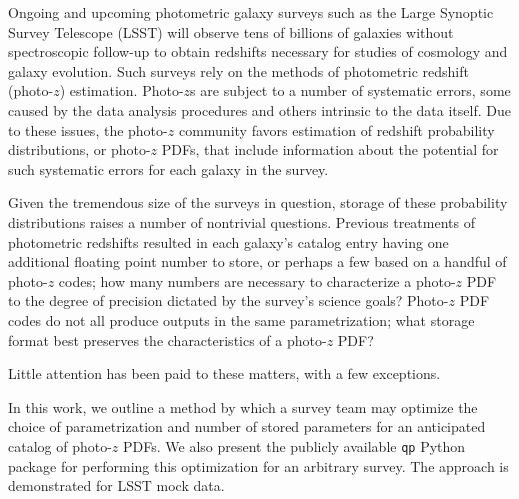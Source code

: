 \documentclass[\docopts]{\docclass}
\begin{document}
Ongoing and upcoming photometric galaxy surveys such as the Large Synoptic Survey Telescope (LSST) will observe tens of billions of galaxies without spectroscopic follow-up to obtain redshifts necessary for studies of cosmology and galaxy evolution.  Such surveys rely on the methods of photometric redshift (photo-$z$) estimation.  Photo-$z$s are subject to a number of systematic errors, some caused by the data analysis procedures and others intrinsic to the data itself.  Due to these issues, the photo-$z$ community favors estimation of redshift probability distributions, or photo-$z$ PDFs, that include information about the potential for such systematic errors for each galaxy in the survey.

Given the tremendous size of the surveys in question, storage of these probability distributions raises a number of nontrivial questions.  Previous treatments of photometric redshifts resulted in each galaxy's catalog entry having one additional floating point number to store, or perhaps a few based on a handful of photo-$z$ codes; how many numbers are necessary to characterize a photo-$z$ PDF to the degree of precision dictated by the survey's science goals?  Photo-$z$ PDF codes do not all produce outputs in the same parametrization; what storage format best preserves the characteristics of a photo-$z$ PDF?

Little attention has been paid to these matters, with a few exceptions.  \citep{carrasco_kind_sparse_2014}

In this work, we outline a method by which a survey team may optimize the choice of parametrization and number of stored parameters for an anticipated catalog of photo-$z$ PDFs.  We also present the publicly available \texttt{qp} Python package for performing this optimization for an arbitrary survey.  The approach is demonstrated for LSST mock data.





%
\end{document}
